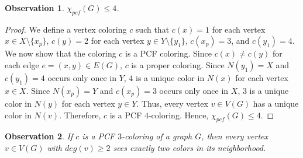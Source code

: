 \documentclass[11pt]{article}
\theoremstyle{plain}
\newtheorem{obs}{Observation}
\begin{document}
\begin{obs}\label{chain_bound}
	$\chi_{pcf}(G)\leq 4$.
\end{obs}

\begin{proof}
	We define a vertex coloring $c$ such that $c(x) = 1$ for each vertex $x\in X\setminus\{x_p\}$, $c(y) = 2$ for each vertex $y\in Y\setminus \{y_1\}$, $c(x_p) = 3$, and $c(y_1) = 4$. We now show that the coloring $c$ is a PCF coloring.  
	Since $c(x) \neq c(y)$ for each edge $e = (x, y) \in E(G)$, $c$ is a proper coloring. Since $N(y_1) = X$ and $c(y_1) = 4$ occurs only once in $Y$, $4$ is a unique color in $N(x)$ for each vertex $x\in X$. Since $N(x_p) = Y$ and $c(x_p) = 3$ occurs only once in $X$, $3$ is a unique color in $N(y)$ for each vertex  $y\in Y$. Thus, every vertex $v \in V(G)$ has a unique color in $N(v)$. Therefore, $c$ is a PCF $4$-coloring. Hence,  $\chi_{pcf}(G)\leq4$.
\end{proof}

\begin{obs}{\label{3pcf-nbd_color}}
	If $c$ is a PCF $3$-coloring of a graph $G$, then every vertex $v\in V(G)$ with $deg(v) \geq 2$ sees exactly two colors in its neighborhood.
\end{obs}
\end{document}
